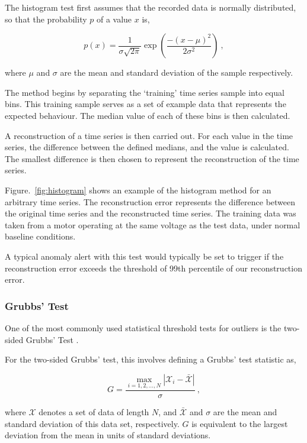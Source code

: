 The histogram test first assumes that the recorded data is normally distributed, so that the probability $p$ of a value $x$ is,

\begin{equation}
    p(x) = \dfrac{1}{\sigma \sqrt{2\pi}}\exp(\dfrac{-{(x-\mu)}^2}{2\sigma^2})~,
\end{equation}

where $\mu$ and $\sigma$ are the mean and standard deviation of the sample respectively.

The method begins by separating the `training' time series sample into equal bins. This training sample serves as a set of example data that represents the expected behaviour. The median value of each of these bins is then calculated.

A reconstruction of a time series is then carried out. For each value in the time series, the difference between the defined medians, and the value is calculated. The smallest difference is then chosen to represent the reconstruction of the time series.

Figure.~\ref{fig:histogram} shows an example of the histogram method for an arbitrary time series. The reconstruction error represents the difference between the original time series and the reconstructed time series. The training data was taken from a motor operating at the same voltage as the test data, under normal baseline conditions.

A typical anomaly alert with this test would typically be set to trigger if the reconstruction error exceeds the threshold of 99th percentile of our reconstruction error.

\subsubsection{Grubbs' Test}
One of the most commonly used statistical threshold tests for outliers is the two-sided Grubbs' Test \cite{CIS-320511}.

For the two-sided Grubbs' test, this involves defining a Grubbs' test statistic as,

\begin{equation}
    G = \dfrac{\underset{i=1,2,...,N}{\max}|\mathcal{X}_i-\bar{\mathcal{X}}|}{\sigma}~,
    \label{eq:grubbs}
\end{equation}

where $\mathcal{X}$ denotes a set of data of length $N$, and $\bar{\mathcal{X}}$ and $\sigma$ are the mean and standard deviation of this data set, respectively. $G$ is equivalent to the largest deviation from the mean in units of standard deviations.  

